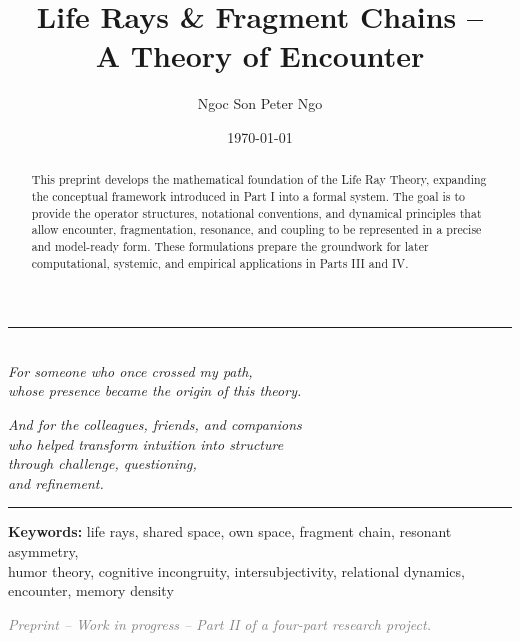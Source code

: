 \documentclass[12pt,a4paper]{article}
\title{\textbf{Life Rays \& Fragment Chains --\\
A Theory of Encounter}}
\author{Ngoc Son Peter Ngo}
\date{\today}
\begin{document}
\maketitle

\vspace{1.5em}
\begin{center}
\rule{0.45\textwidth}{0.4pt} \\[1em]

\textit{
For someone who once crossed my path, \\
whose presence became the origin of this theory.
}

\vspace{0.6em}

\textit{
And for the colleagues, friends, and companions \\
who helped transform intuition into structure \\
through challenge, questioning,\\
and refinement.
}

\rule{0.45\textwidth}{0.4pt}
\end{center}
\vspace{2em}

\tableofcontents
\newpage
\onehalfspacing

\begin{abstract}
This preprint develops the mathematical foundation of the Life Ray Theory, expanding the
conceptual framework introduced in Part I into a formal system. The goal is to provide
the operator structures, notational conventions, and dynamical principles that allow
encounter, fragmentation, resonance, and coupling to be represented in a precise and
model-ready form. These formulations prepare the groundwork for later computational,
systemic, and empirical applications in Parts III and IV.
\end{abstract}

\vspace{1em}
\textbf{Keywords:}
life rays, shared space, own space, fragment chain, resonant asymmetry,\\
humor theory, cognitive incongruity, intersubjectivity, relational dynamics,\\
encounter, memory density

\vspace{1em}
\begin{center}
\textcolor{gray}{\small \textit{Preprint – Work in progress – Part II of a four-part research project.}}
\end{center}
\vspace{1em}
\end{document}
